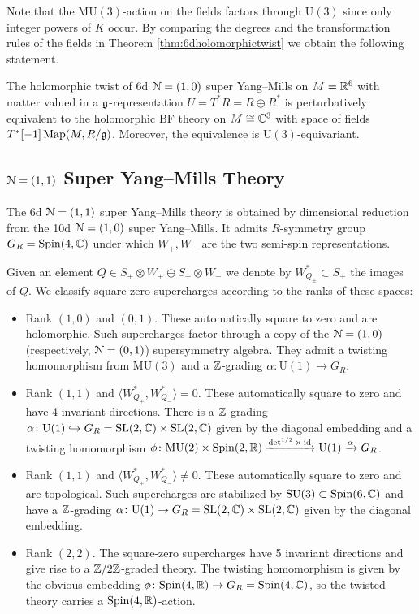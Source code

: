 \documentclass[10pt, oneside]{article}
\newcommand{\MU}{\mathrm{MU}}
\renewcommand{\U}{\mathrm{U}}
\begin{document}
Note that the $\MU(3)$-action on the fields factors through $\U(3)$ since only integer powers of $K$ occur. By comparing the degrees and the transformation rules of the fields in Theorem \ref{thm:6dholomorphictwist} we obtain the following statement.

\begin{theorem}
The holomorphic twist of 6d $\mathcal N=(1, 0)$ super Yang--Mills on $M=\mathbb R^6$ with matter valued in a $\mathfrak g$-representation $U=T^*R=R\oplus R^*$ is perturbatively equivalent to the holomorphic BF theory on $M\cong \mathbb C^3$ with space of fields $T^*[-1]\operatorname{Map}(M, R/\mathfrak g)$. Moreover, the equivalence is $\U(3)$-equivariant.
\label{thm:6dholomorphictwistgraded}
\end{theorem}

\subsection{\texorpdfstring{$\mathcal N=(1, 1)$}{N=(1, 1)} Super Yang--Mills Theory}

The 6d $\mathcal N=(1, 1)$ super Yang--Mills theory is obtained by dimensional reduction from the 10d $\mathcal N=(1, 0)$ super Yang--Mills. It admits $R$-symmetry group $G_R=\mathrm{Spin}(4, \mathbb C)$ under which $W_+, W_-$ are the two semi-spin representations.

Given an element $Q\in S_+\otimes W_+\oplus S_-\otimes W_-$ we denote by $W^*_{Q_\pm}\subset S_\pm$ the images of $Q$. We classify square-zero supercharges according to the ranks of these spaces:
\begin{itemize}
\item Rank $(1, 0)$ and $(0, 1)$. These automatically square to zero and are holomorphic.  Such supercharges factor through a copy of the $\mathcal{N}=(1,0)$ (respectively, $\mathcal N=(0, 1)$) supersymmetry algebra. They admit a twisting homomorphism from $\MU(3)$ and a $\mathbb Z$-grading $\alpha\colon \U(1)\rightarrow G_R$.

\item Rank $(1, 1)$ and $\langle W^*_{Q_+}, W^*_{Q_-}\rangle = 0$. These automatically square to zero and have 4 invariant directions. There is a $\mathbb Z$-grading $\alpha\colon \U(1)\hookrightarrow G_R=\SL(2, \CC)\times \SL(2, \CC)$ given by the diagonal embedding and a twisting homomorphism $\phi\colon \MU(2)\times \Spin(2, \RR)\xrightarrow{\det^{1/2}\times \id}\U(1)\xrightarrow{\alpha} G_R$.

\item Rank $(1, 1)$ and $\langle W^*_{Q_+}, W^*_{Q_-}\rangle \neq 0$. These automatically square to zero and are topological. Such supercharges are stabilized by $\mathrm{SU}(3)\subset \mathrm{Spin}(6, \mathbb C)$ and have a $\mathbb Z$-grading $\alpha\colon \U(1)\rightarrow G_R=\SL(2, \CC)\times \SL(2, \CC)$ given by the diagonal embedding.

\item Rank $(2, 2)$. The square-zero supercharges have 5 invariant directions and give rise to a $\mathbb Z/2\mathbb Z$-graded theory. The twisting homomorphism is given by the obvious embedding $\phi\colon \mathrm{Spin}(4, \mathbb R)\rightarrow G_R=\mathrm{Spin}(4, \mathbb C)$, so the twisted theory carries a $\mathrm{Spin}(4, \mathbb R)$-action.
\end{itemize}
\end{document}
